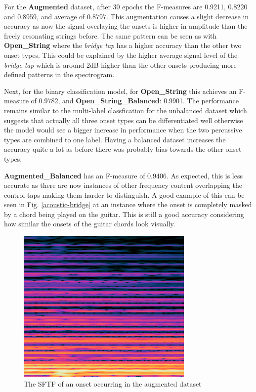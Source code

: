 \documentclass[conference]{IEEEtran}
\begin{document}
For the \textbf{Augmented} dataset, after 30 epochs the F-measures are 0.9211, 0.8220 and 0.8959, and average of 0.8797. This augmentation causes a slight decrease in accuracy as now the signal overlaying the onsets
is higher in amplitude than the freely resonating strings before. The same pattern can be seen as with \textbf{Open\_String} where the \emph{bridge tap} has a higher accuracy than the other two onset types. This could be
explained by the higher average signal level of the \emph{bridge tap} which is around 2dB higher than the other onsets producing more defined patterns in the spectrogram.

Next, for the binary classification model, for \textbf{Open\_String} this achieves an F-measure of 0.9782, and \textbf{Open\_String\_Balanced}: 0.9901. The performance remains similar to the multi-label classfication for the unbalanced
dataset which suggests that actually all three onset types can be differentiated well otherwise the model would see a bigger increase in performance when the two percussive types are combined to one label. Having a balanced dataset increases
the accuracy quite a lot as before there was probably bias towards the other onset types.

\textbf{Augmented\_Balanced} has an F-measure of 0.9406. As expected, this is less accurate as there are now instances of other frequency content overlapping the control taps making them harder
to distinguish. A good example of this can be seen in Fig. \ref{acoustic-bridge} at an instance where the onset is completely masked by a chord being played on the guitar. This is still a good accuracy considering how similar the onsets of the guitar chords
look visually.

\begin{figure}[htbp]
    \centerline{\includegraphics[scale=0.4]{augmented-bridge.png}}
    \caption{The SFTF of an onset occurring in the augmented dataset}
    \label{augmented-bridge}
    \end{figure}
\end{document}
